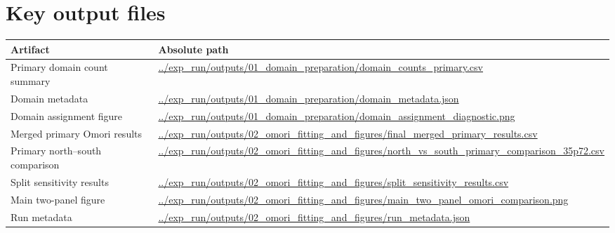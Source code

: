 \documentclass[11pt]{article}
\begin{document}
\section*{Key output files}
\begin{longtable}{>{\RaggedRight\arraybackslash}p{3.2cm} >{\RaggedRight\arraybackslash}p{10.5cm}}
\toprule
Artifact & Absolute path \\
\midrule
Primary domain count summary & \url{../exp_run/outputs/01_domain_preparation/domain_counts_primary.csv} \\
Domain metadata & \url{../exp_run/outputs/01_domain_preparation/domain_metadata.json} \\
Domain assignment figure & \url{../exp_run/outputs/01_domain_preparation/domain_assignment_diagnostic.png} \\
Merged primary Omori results & \url{../exp_run/outputs/02_omori_fitting_and_figures/final_merged_primary_results.csv} \\
Primary north--south comparison & \url{../exp_run/outputs/02_omori_fitting_and_figures/north_vs_south_primary_comparison_35p72.csv} \\
Split sensitivity results & \url{../exp_run/outputs/02_omori_fitting_and_figures/split_sensitivity_results.csv} \\
Main two-panel figure & \url{../exp_run/outputs/02_omori_fitting_and_figures/main_two_panel_omori_comparison.png} \\
Run metadata & \url{../exp_run/outputs/02_omori_fitting_and_figures/run_metadata.json} \\
\bottomrule
\end{longtable}
\end{document}
